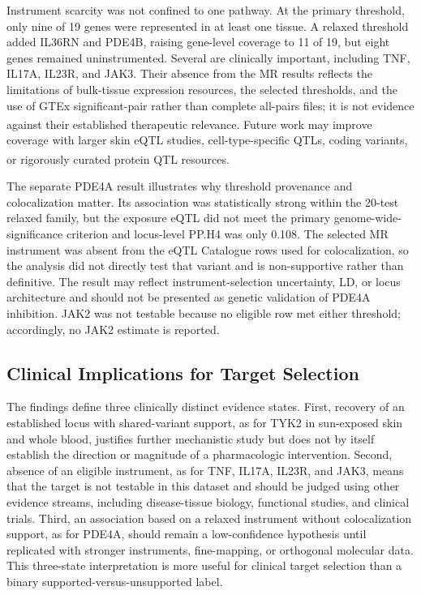 Instrument scarcity was not confined to one pathway. At the primary threshold, only nine of 19 genes were represented in at least one tissue. A relaxed threshold added IL36RN and PDE4B, raising gene-level coverage to 11 of 19, but eight genes remained uninstrumented. Several are clinically important, including TNF, IL17A, IL23R, and JAK3. Their absence from the MR results reflects the limitations of bulk-tissue expression resources, the selected thresholds, and the use of GTEx significant-pair rather than complete all-pairs files; it is not evidence against their established therapeutic relevance.\textsuperscript{\cite{gill2024pitfalls}} Future work may improve coverage with larger skin eQTL studies, cell-type-specific QTLs, coding variants, or rigorously curated protein QTL resources.\textsuperscript{\cite{sun2023plasma,ferkingstad2021proteome,trajanoska2023target}}

The separate PDE4A result illustrates why threshold provenance and colocalization matter. Its association was statistically strong within the 20-test relaxed family, but the exposure eQTL did not meet the primary genome-wide-significance criterion and locus-level PP.H4 was only 0.108. The selected MR instrument was absent from the eQTL Catalogue rows used for colocalization, so the analysis did not directly test that variant and is non-supportive rather than definitive. The result may reflect instrument-selection uncertainty, LD, or locus architecture and should not be presented as genetic validation of PDE4A inhibition. JAK2 was not testable because no eligible row met either threshold; accordingly, no JAK2 estimate is reported.

\subsection*{Clinical Implications for Target Selection}

The findings define three clinically distinct evidence states. First, recovery of an established locus with shared-variant support, as for TYK2 in sun-exposed skin and whole blood, justifies further mechanistic study but does not by itself establish the direction or magnitude of a pharmacologic intervention. Second, absence of an eligible instrument, as for TNF, IL17A, IL23R, and JAK3, means that the target is not testable in this dataset and should be judged using other evidence streams, including disease-tissue biology, functional studies, and clinical trials. Third, an association based on a relaxed instrument without colocalization support, as for PDE4A, should remain a low-confidence hypothesis until replicated with stronger instruments, fine-mapping, or orthogonal molecular data. This three-state interpretation is more useful for clinical target selection than a binary supported-versus-unsupported label.

